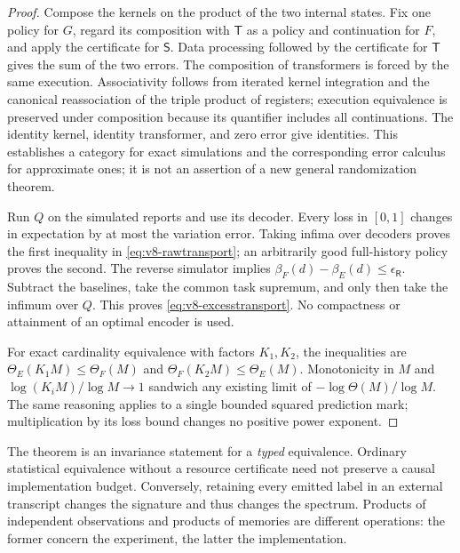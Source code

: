 \begin{proof}
Compose the kernels on the product of the two internal states. Fix one
policy for $G$, regard its composition with $\mathsf T$ as a policy and
continuation for $F$, and apply the certificate for $\mathsf S$.
Data processing followed by the certificate for $\mathsf T$ gives the
sum of the two errors. The composition of transformers is forced by the
same execution. Associativity follows from iterated kernel integration
and the canonical reassociation of the triple product of registers;
execution equivalence is preserved under composition because its
quantifier includes all continuations. The identity kernel, identity
transformer, and zero error give identities. This establishes a category
for exact simulations and the corresponding error calculus for approximate
ones; it is not an assertion of a new general randomization theorem.

Run $Q$ on the simulated reports and use its decoder. Every loss in
$[0,1]$ changes in expectation by at most the variation error. Taking
infima over decoders proves the first inequality in
\eqref{eq:v8-rawtransport}; an arbitrarily good full-history policy proves
the second. The reverse simulator implies
$\beta_F(d)-\beta_E(d)\le\epsilon_{\mathsf R}$. Subtract the baselines,
take the common task supremum, and only then take the infimum over $Q$.
This proves \eqref{eq:v8-excesstransport}. No compactness or attainment of
an optimal encoder is used.

For exact cardinality equivalence with factors $K_1,K_2$, the inequalities
are $\Theta_E(K_1M)\le\Theta_F(M)$ and
$\Theta_F(K_2M)\le\Theta_E(M)$. Monotonicity in $M$ and
$\log(K_iM)/\log M\to1$ sandwich any existing limit of
$-\log\Theta(M)/\log M$. The same reasoning applies to a single bounded
squared prediction mark; multiplication by its loss bound changes no
positive power exponent.
\end{proof}

The theorem is an invariance statement for a \emph{typed} equivalence.
Ordinary statistical equivalence without a resource certificate need not
preserve a causal implementation budget. Conversely, retaining every
emitted label in an external transcript changes the signature and thus
changes the spectrum. Products of independent observations and products
of memories are different operations: the former concern the experiment,
the latter the implementation.

